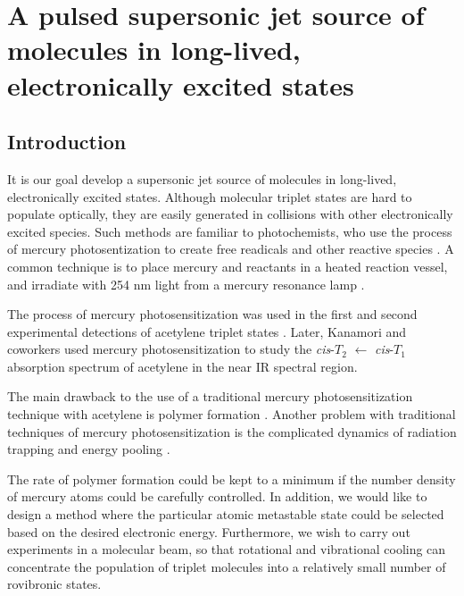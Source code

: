 % 



\chapter{A pulsed supersonic jet source of molecules in long-lived,
  electronically excited states
}

\section{Introduction}


It is our goal develop a supersonic jet source of molecules in
long-lived, electronically excited states.  Although molecular triplet
states are hard to populate optically, they are easily generated in
collisions with other electronically excited species.  Such methods
are familiar to photochemists, who use the process of mercury
photosentization to create free readicals and other reactive species
\cite{brown89, brown88, crabtree92, cvetanovic64, phillips74,
  strausz70}.  A common technique is to place mercury and reactants in
a heated reaction vessel, and irradiate with 254 nm light from a
mercury resonance lamp \cite{brown87}.

The process of mercury photosensitization was used in the first and
second experimental detections of acetylene triplet states
\cite{burton72, wendt79}.  Later, Kanamori and coworkers used mercury
photosensitization to study the \emph{cis}-$T_2$ $\leftarrow$
\emph{cis}-$T_1$ absorption spectrum of acetylene \cite{kanamori07} in
the near IR spectral region.

The main drawback to the use of a traditional mercury
photosensitization technique with acetylene is polymer formation
\cite{shida58, leroy44}.  Another problem with traditional techniques
of mercury photosensitization is the complicated dynamics of radiation
trapping and energy pooling \cite{menningen00, herd05, majetich89,
  majetich91}.

The rate of polymer formation could be kept to a minimum if the number
density of mercury atoms could be carefully controlled.  In addition,
we would like to design a method where the particular atomic
metastable state could be selected based on the desired electronic
energy.  Furthermore, we wish to carry out experiments in a molecular
beam, so that rotational and vibrational cooling can concentrate the
population of triplet molecules into a relatively small number of
rovibronic states.

